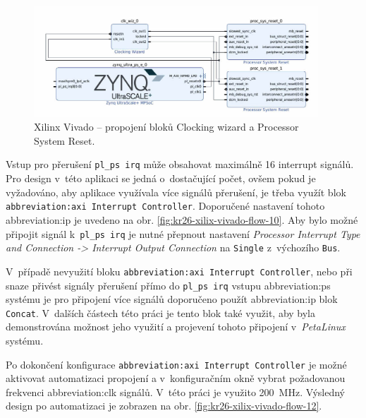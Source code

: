 \documentclass[a4paper, twoside, 11pt]{article}
\begin{document}
				\begin{figure}[htbp!]
					\centering
					\includegraphics[width=0.95\textwidth]{src/png/kr26-xilinx-vivado-flow/kr26-xilix-vivado-flow-09.jpg}
					\caption{Xilinx Vivado – propojení bloků Clocking wizard a Processor System Reset.}
					\label{fig:kr26-xilix-vivado-flow-09}
				\end{figure}
				
				Vstup pro přerušení \texttt{pl\_ps irq} může obsahovat maximálně 16 interrupt signálů. Pro design v~této aplikaci se jedná o~dostačující počet, ovšem pokud je vyžadováno, aby aplikace využívala více signálů přerušení, je třeba využít blok \texttt{\gls{abbreviation:axi} Interrupt Controller}. Doporučené nastavení tohoto \gls{abbreviation:ip} je uvedeno na obr. \ref{fig:kr26-xilix-vivado-flow-10}. Aby bylo možné připojit signál k~\texttt{pl\_ps irq} je nutné přepnout nastavení \textit{Processor Interrupt Type and Connection -> Interrupt Output Connection} na \texttt{Single} z~výchozího \texttt{Bus}.\par
				V~případě nevyužití bloku \texttt{\gls{abbreviation:axi} Interrupt Controller}, nebo při snaze přivést signály přerušení přímo do \texttt{pl\_ps irq} vstupu \gls{abbreviation:ps} systému je pro připojení více signálů doporučeno použít \gls{abbreviation:ip} blok \texttt{Concat}. V~dalších částech této práci je tento blok také využit, aby byla demonstrována možnost jeho využití a projevení tohoto připojení v~\textit{PetaLinux} systému.\par
				Po dokončení konfigurace \texttt{\gls{abbreviation:axi} Interrupt Controller} je možné aktivovat automatizaci propojení a v~konfiguračním okně vybrat požadovanou frekvenci \gls{abbreviation:clk} signálů. V~této práci je využito 200~MHz. Výsledný design po automatizaci je zobrazen na obr. \ref{fig:kr26-xilix-vivado-flow-12}.\par
\end{document}
